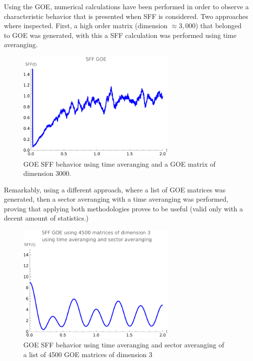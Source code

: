 \documentclass[10pt,a4paper]{article}
\begin{document}
Using the GOE, numerical calculations have been performed in order to observe a characteristic behavior that is presented when SFF is considered.
Two approaches where inspected. First, a high order matrix (dimension $\approx 3,000$) that belonged to GOE was generated, with this
a SFF calculation was performed using time averanging.
\begin{figure}[H]
    \centering
    \includegraphics[width=0.7\textwidth]{TAvergGOE.pdf}
    \caption{GOE SFF behavior using time averanging and a GOE matrix of dimension 3000.}
    \label{fig:TAvergGOE}
\end{figure}
Remarkably, using a different approach, where a list of GOE matrices was generated, then a sector averanging with a time averanging was performed,
proving that applying both methodologies proves to be useful (valid only with a decent amount of statistics.)
\begin{figure}[H]
    \centering
    \includegraphics[width=0.7\textwidth]{SFFGOETS3.pdf}
    \caption{GOE SFF behavior using time averanging and sector averanging of a list of 4500 GOE matrices of dimension 3}
    \label{fig:SFFGOETS3}
\end{figure}
\end{document}
